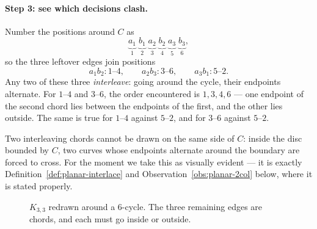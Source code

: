 \paragraph{Step 3: see which decisions clash.}
Number the positions around $C$ as
\[
  \underbrace{a_1}_{1}\;\underbrace{b_1}_{2}\;\underbrace{a_2}_{3}\;
  \underbrace{b_2}_{4}\;\underbrace{a_3}_{5}\;\underbrace{b_3}_{6},
\]
so the three leftover edges join positions
\[
  a_1b_2 : 1\text{--}4, \qquad a_2b_3 : 3\text{--}6, \qquad a_3b_1 : 5\text{--}2 .
\]
Any two of these three \emph{interleave}: going around the cycle, their
endpoints alternate. For $1\text{--}4$ and $3\text{--}6$, the order encountered
is $1,3,4,6$ --- one endpoint of the second chord lies between the endpoints of
the first, and the other lies outside. The same is true for $1\text{--}4$
against $5\text{--}2$, and for $3\text{--}6$ against $5\text{--}2$.

Two interleaving chords cannot be drawn on the same side of $C$: inside the
disc bounded by $C$, two curves whose endpoints alternate around the boundary
are forced to cross. For the moment we take this as visually evident --- it is
exactly Definition~\ref{def:planar-interlace} and Observation~\ref{obs:planar-2col} below,
where it is stated properly.

\begin{figure}[ht]
\centering
{}
\caption{$K_{3,3}$ redrawn around a $6$-cycle. The three remaining edges are
chords, and each must go inside or outside.}
\label{fig:planar-k33-cycle}
\end{figure}

